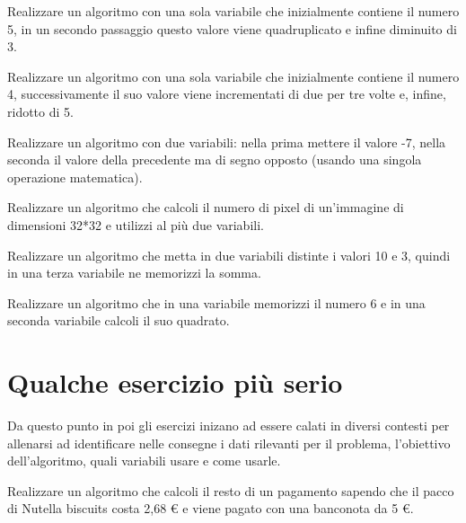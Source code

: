 \begin{exercise}
	Realizzare un algoritmo con una sola variabile che inizialmente contiene il numero 5, in un secondo passaggio questo valore viene quadruplicato e infine diminuito di 3.
\end{exercise}

\begin{exercise}
	Realizzare un algoritmo con una sola variabile che inizialmente contiene il numero 4, successivamente il suo valore viene incrementati di due per tre volte e, infine, ridotto di 5.
\end{exercise}

\begin{exercise}
	Realizzare un algoritmo con due variabili: nella prima mettere il valore -7, nella seconda il valore della precedente ma di segno opposto (usando una singola operazione matematica).
\end{exercise}

\begin{exercise}
	Realizzare un algoritmo che calcoli il numero di pixel di un'immagine di dimensioni 32*32 e utilizzi al più due variabili.
\end{exercise}

\begin{exercise}
	Realizzare un algoritmo che metta in due variabili distinte i valori 10 e 3, quindi in una terza variabile ne memorizzi la somma.
\end{exercise}

\begin{exercise}
	Realizzare un algoritmo che in una variabile memorizzi il numero 6 e in una seconda variabile calcoli il suo quadrato.
\end{exercise}

\section{Qualche esercizio più serio}

Da questo punto in poi gli esercizi inizano ad essere calati in diversi contesti per allenarsi ad identificare nelle consegne i dati rilevanti per il problema, l'obiettivo dell'algoritmo, quali variabili usare e come usarle.

\begin{exercise}
	Realizzare un algoritmo che calcoli il resto di un pagamento sapendo che il pacco di Nutella biscuits costa 2,68 € e viene pagato con una banconota da 5 €.
\end{exercise}

